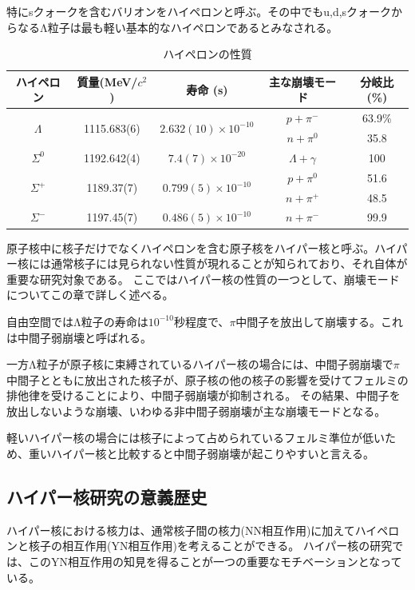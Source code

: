 \documentclass[a4paper,11pt,uplatex]{jsbook}
\begin{document}
特にsクォークを含むバリオンをハイペロンと呼ぶ。その中でもu,d,sクォークからなるΛ粒子は最も軽い基本的なハイペロンであるとみなされる。
\begin{table}[h]
\centering
\begin{tabular}{|c|c|c|c|c|}
  \hline
  ハイペロン&質量(MeV/$c^2$)&寿命 (s)&主な崩壊モード&分岐比(\%)\\
  \hline \hline 
  \multirow{2}{*}{$\Lambda$} & \multirow{2}{*}{1115.683(6)} & \multirow{2}{*}{$2.632(10) \times 10^{-10}$} & $p + \pi^-$ &63.9\%\\
                             &                              &                                              & $n + \pi^0$ & 35.8\\ \hline
  $\Sigma^0$                 & 1192.642(4)                  & $7.4(7) \times 10^{-20}$                     & $\Lambda + \gamma$ & 100\\ \hline
  \multirow{2}{*}{$\Sigma^+$}& \multirow{2}{*}{1189.37(7)}  & \multirow{2}{*}{$0.799(5) \times 10^{-10}$}  & $p + \pi^0$ & 51.6\\
                             &                              &                                              & $n + \pi^+$ & 48.5\\ \hline
  $\Sigma^-$                 & 1197.45(7)                   & $0.486(5) \times 10^{-10}$                   & $n + \pi^-$ & 99.9\\ \hline
\end{tabular}
\caption{ハイペロンの性質}
\end{table}

原子核中に核子だけでなくハイペロンを含む原子核をハイパー核と呼ぶ。ハイパー核には通常核子には見られない性質が現れることが知られており、それ自体が重要な研究対象である。
ここではハイパー核の性質の一つとして、崩壊モードについてこの章で詳しく述べる。

自由空間ではΛ粒子の寿命は$10^{-10}$秒程度で、$\pi$中間子を放出して崩壊する。これは中間子弱崩壊と呼ばれる。

一方Λ粒子が原子核に束縛されているハイパー核の場合には、中間子弱崩壊で$\pi$中間子とともに放出された核子が、原子核の他の核子の影響を受けてフェルミの排他律を受けることにより、中間子弱崩壊が抑制される。
その結果、中間子を放出しないような崩壊、いわゆる非中間子弱崩壊が主な崩壊モードとなる。

軽いハイパー核の場合には核子によって占められているフェルミ準位が低いため、重いハイパー核と比較すると中間子弱崩壊が起こりやすいと言える。

\subsection{ハイパー核研究の意義歴史}
ハイパー核における核力は、通常核子間の核力(NN相互作用)に加えてハイペロンと核子の相互作用(YN相互作用)を考えることができる。
ハイパー核の研究では、このYN相互作用の知見を得ることが一つの重要なモチベーションとなっている。
\end{document}
